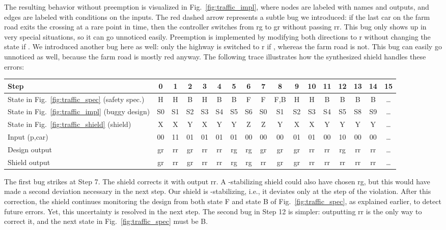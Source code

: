 \documentclass{llncs}
\newcommand{\err}{{\color{darkred}}}
\begin{document}
The resulting behavior without preemption is visualized in 
Fig.~\ref{fig:traffic_impl}, where nodes are labeled with names and 
outputs, and edges are labeled with conditions on the inputs.  The red 
dashed arrow represents a subtle bug we introduced: if the last car on 
the farm road exits the crossing at a rare point in time, then the 
controller switches from \textsf{rg} to \textsf{gr} without passing 
\textsf{rr}. This bug only shows up in very special situations, so it 
can go unnoticed easily.  Preemption is implemented by modifying both 
directions to \textsf{r} without changing the state if .  
We introduced another bug here as well: only the highway is switched to 
\textsf{r} if , whereas the farm road is not. This bug can 
easily go unnoticed as well, because the farm road is mostly red anyway.
The following trace illustrates how the synthesized shield handles these 
errors:

\begin{center}
\setlength{\tabcolsep}{1.3pt}
\begin{tabular}{l|c|c|c|c|c|c|c|c|c|c|c|c|c|c|c|c}\hline
Step                                 &0 &1 &2 &3 &4 &5 &6 &7     &8  &9 &10&11&12    &13&14&15    \\
\hline
State in Fig.~\ref{fig:traffic_spec} (safety spec.)
                                     &H &H &B &H &B &B &F &F     &F,B&H &H &B &B     &B &B &\ldots\\
State in Fig.~\ref{fig:traffic_impl} (buggy design)
                                     &S0&S1&S2&S3&S4&S5&S6&S0    &S1 &S2&S3&S4&S5    &S8&S9&\ldots\\
State in Fig.~\ref{fig:traffic_shield} (shield)
                                     &X &X &Y &X &Y &Y &Z &Z     &Y  &X &X &Y &Y     &Y &Y &\ldots\\

                                     
Input (\textsf{p,car})               &00&11&01&01&01&01&00&00    &00 &01&01&00&10    &00&00&\ldots\\
Design output                        &gr&rr&gr&rr&rr&rg&rg&gr\err&gr &gr&rr&rr&rg\err&rr&rr&\ldots\\
Shield output                        &gr&rr&gr&rr&rr&rg&rg&rr    &gr &gr&rr&rr&rr    &rr&rr&\ldots\\
\hline
\end{tabular}
\end{center}

\noindent
The first bug strikes at Step 7. The shield corrects it with output 
\textsf{rr}. A -stabilizing shield could also have chosen 
\textsf{rg}, but this would have made a second deviation necessary in 
the next step. Our shield is -stabilizing, i.e., it deviates only at 
the step of the violation. After this correction, the shield continues 
monitoring the design from both state F and state B of 
Fig.~\ref{fig:traffic_spec}, as explained earlier, to detect future 
errors. Yet, this uncertainty is resolved in the next step.  The second 
bug in Step 12 is simpler: outputting \textsf{rr} is the only way to 
correct it, and the next state in Fig.~\ref{fig:traffic_spec} must be B.
\end{document}
